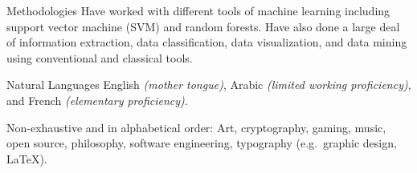 \documentclass[10pt,a4paper]{article}
\begin{document}
\inlineheadsection 
{Methodologies}
{Have worked with different tools of machine learning including support vector machine (SVM) and random forests. Have also done a large deal of information extraction, data classification, data visualization, and data mining using conventional and classical tools.}

\inlineheadsection 
{Natural Languages}
{English \textit{(mother tongue)}, Arabic \textit{(limited working proficiency)}, and French \textit{(elementary proficiency)}.}


\spacedhrule{1.6em}{-0.4em} %



\inlineheadsection %
{Non-exhaustive and in alphabetical order:}
{Art, cryptography, gaming, music, open source, philosophy, software engineering, typography (e.g.\ graphic design, \LaTeX).}

\end{document}
